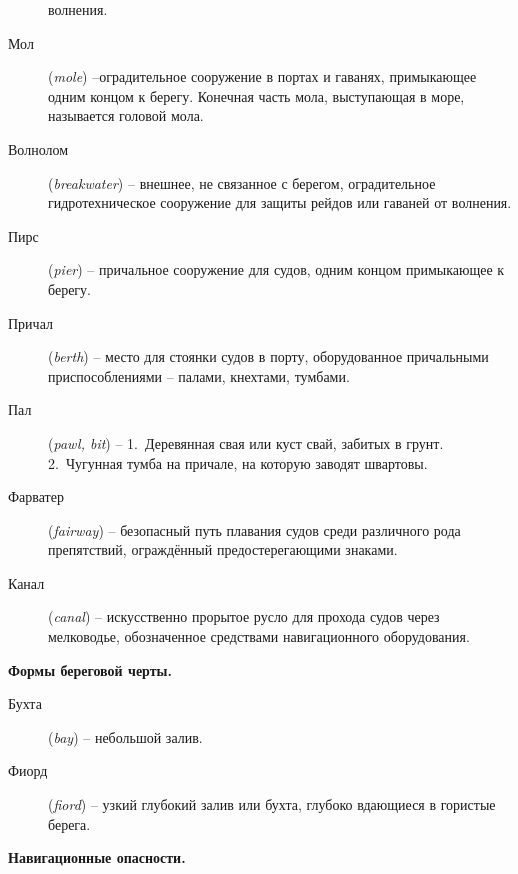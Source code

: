 \begin{description}
  волнения.
\item [Мол] (\textit{mole}) \---оградительное
  сооружение в портах и гаванях, примыкающее одним концом к
  берегу. Конечная часть мола, выступающая в море, называется головой
  мола.
\item [Волнолом]
  (\textit{breakwater}) \---
  внешнее, не связанное с берегом, оградительное гидротехническое
  сооружение для защиты рейдов или гаваней от волнения.
\item [Пирс] (\textit{pier}) \--- причальное
  сооружение для судов, одним концом примыкающее к берегу.
\item [Причал] (\textit{berth}) \--- место для стоянки судов в порту,
  оборудованное причальными приспособлениями \--- палами, кнехтами,
  тумбами.
\item [Пал] (\textit{pawl, bit})
  \--- 1.~Деревянная свая или куст
  свай, забитых в грунт. 2.~Чугунная тумба на причале, на которую
  заводят швартовы.
\item [Фарватер] (\textit{fairway})
  \--- безопасный путь плавания
  судов среди различного рода препятствий, ограждённый
  предостерегающими знаками.
\item [Канал] (\textit{canal}) \---
  искусственно прорытое русло для прохода судов через мелководье,
  обозначенное средствами навигационного оборудования.
\end{description}

\textbf{Формы береговой черты.}

\begin{description}
\item [Бухта] (\textit{bay}) \--- небольшой
  залив.
\item [Фиорд] (\textit{fiord}) \--- узкий
  глубокий залив или бухта, глубоко вдающиеся в гористые берега.
\end{description}

\textbf{Навигационные опасности.}

